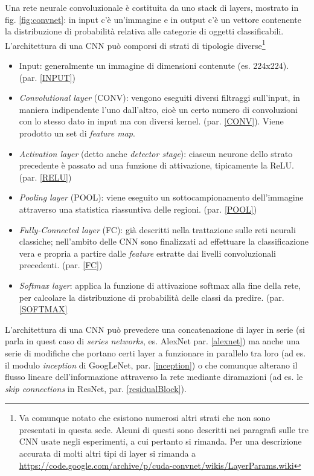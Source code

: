 Una rete neurale convoluzionale è costituita da uno stack di layers, mostrato in fig. \ref{fig:convnet}: in input c'è un'immagine e in output c'è un vettore contenente la distribuzione di probabilità relativa alle categorie di oggetti classificabili.\\

L'architettura di una CNN può comporsi di strati di tipologie diverse\footnote{Va comunque notato che esistono numerosi altri strati che non sono presentati in questa sede. Alcuni di questi sono descritti nei paragrafi sulle tre CNN usate negli esperimenti, a cui pertanto si rimanda. Per una descrizione accurata di molti altri tipi di layer si rimanda a \url{https://code.google.com/archive/p/cuda-convnet/wikis/LayerParams.wiki}}

\begin{itemize}
	\item Input: generalmente un immagine di dimensioni contenute (es. 224x224). (par. \ref{INPUT})
	\item \textit{Convolutional layer} (CONV): vengono eseguiti diversi filtraggi sull'input, in maniera indipendente l'uno dall'altro, cioè un certo numero di convoluzioni con lo stesso dato in input ma con diversi kernel. (par. \ref{CONV}). Viene prodotto un set di \textit{feature map}.
	\item \textit{Activation layer} (detto anche \textit{ detector stage}): ciascun neurone dello strato precedente è passato ad una funzione di attivazione, tipicamente la ReLU. (par. \ref{RELU})
	\item \textit{Pooling layer} (POOL): viene eseguito un sottocampionamento dell'immagine attraverso una statistica riassuntiva delle regioni. (par. \ref{POOL})
	\item \textit{Fully-Connected layer} (FC): già descritti nella trattazione sulle reti neurali classiche; nell'ambito delle CNN sono finalizzati ad effettuare la classificazione vera e propria a partire dalle \textit{feature} estratte dai livelli convoluzionali precedenti. (par. \ref{FC})
	\item \textit{Softmax layer}: applica la funzione di attivazione softmax alla fine della rete, per calcolare la distribuzione di probabilità delle classi da predire. (par. \ref{SOFTMAX}
\end{itemize}

L'architettura di una CNN può prevedere una concatenazione di layer in serie (si parla in quest caso di \textit{series networks}, es. AlexNet par. \ref{alexnet}) ma anche una serie di modifiche che portano certi layer a funzionare in parallelo tra loro (ad es. il modulo \textit{inception} di GoogLeNet, par. \ref{inception}) o che comunque alterano il flusso lineare dell'informazione attraverso la rete mediante diramazioni (ad es. le \textit{skip connections} in ResNet, par. \ref{residualBlock}).

